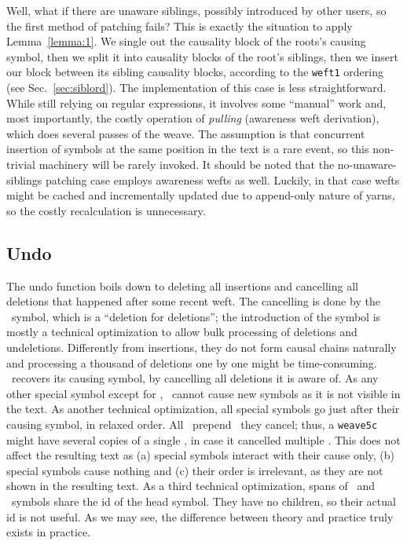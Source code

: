 \documentclass{acm_proc_article-sp}
\begin{document}
Well, what if there are unaware siblings, possibly introduced
by other users, so the first method of patching fails?
This is exactly the situation to apply Lemma~\ref{lemma:1}. 
We single out the causality block of
the roots's causing symbol, then we split it into causality
blocks of the root's siblings, then we insert our block between
its sibling causality blocks,
according to the {\tt weft1} ordering (see Sec.~\ref{sec:siblord}).
The implementation of this case is less straightforward. While
still relying on regular expressions, it involves some
``manual'' work and, most importantly, the costly operation
of \emph{pulling} (awareness weft derivation), which does
several passes of the weave.
The assumption is that concurrent
insertion of symbols at the same position in the text is
a rare event, so this non-trivial machinery will be rarely
invoked.
It should be noted that the no-unaware-siblings patching case
employs awareness wefts as well. Luckily, in that case
wefts might be cached and incrementally updated
due to append-only nature of yarns, so the costly recalculation
is unnecessary.

\subsection{Undo}

The undo function boils down to deleting all insertions and
cancelling all deletions that happened after some recent weft.
The cancelling is done by the \cnc ~symbol, which is a ``deletion for
deletions''; the introduction of the symbol is mostly a technical
optimization to allow bulk processing of deletions and
undeletions. Differently from insertions, they do
not form causal chains naturally and processing a thousand of
deletions one by one might be time-consuming.
\cnc ~recovers its causing symbol, by cancelling all deletions it
is aware of. As any other special symbol except for \aum,
\cnc ~cannot cause new symbols as it is not visible in the text.
As another technical optimization, all special symbols go
just after their causing symbol, in relaxed order. All 
\cnc ~prepend \bsp ~they cancel; thus, a {\tt weave5c} might have 
several copies of a single \cnc, in case it cancelled
multiple \bsp. This
does not affect the resulting text as (a) special symbols
interact with their cause only, (b) special symbols cause
nothing and (c) their order is irrelevant, as they are not
shown in the resulting text. As a third technical optimization,
spans of \bsp ~and \cnc ~symbols share the id of the head symbol.
They have no children, so their actual id is not useful.
As we may see, the difference between theory and practice
truly exists in practice.
\end{document}
